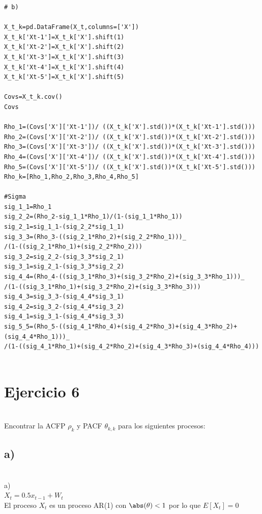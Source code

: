 \documentclass{article}
\begin{document}
\begin{verbatim}
# b)

X_t_k=pd.DataFrame(X_t,columns=['X'])
X_t_k['Xt-1']=X_t_k['X'].shift(1)
X_t_k['Xt-2']=X_t_k['X'].shift(2)
X_t_k['Xt-3']=X_t_k['X'].shift(3)
X_t_k['Xt-4']=X_t_k['X'].shift(4)
X_t_k['Xt-5']=X_t_k['X'].shift(5)

Covs=X_t_k.cov()
Covs

Rho_1=(Covs['X']['Xt-1'])/ ((X_t_k['X'].std())*(X_t_k['Xt-1'].std()))
Rho_2=(Covs['X']['Xt-2'])/ ((X_t_k['X'].std())*(X_t_k['Xt-2'].std()))
Rho_3=(Covs['X']['Xt-3'])/ ((X_t_k['X'].std())*(X_t_k['Xt-3'].std()))
Rho_4=(Covs['X']['Xt-4'])/ ((X_t_k['X'].std())*(X_t_k['Xt-4'].std()))
Rho_5=(Covs['X']['Xt-5'])/ ((X_t_k['X'].std())*(X_t_k['Xt-5'].std()))
Rho_k=[Rho_1,Rho_2,Rho_3,Rho_4,Rho_5]

#Sigma
sig_1_1=Rho_1
sig_2_2=(Rho_2-sig_1_1*Rho_1)/(1-(sig_1_1*Rho_1))
sig_2_1=sig_1_1-(sig_2_2*sig_1_1)
sig_3_3=(Rho_3-((sig_2_1*Rho_2)+(sig_2_2*Rho_1)))_
/(1-((sig_2_1*Rho_1)+(sig_2_2*Rho_2)))
sig_3_2=sig_2_2-(sig_3_3*sig_2_1)
sig_3_1=sig_2_1-(sig_3_3*sig_2_2)
sig_4_4=(Rho_4-((sig_3_1*Rho_3)+(sig_3_2*Rho_2)+(sig_3_3*Rho_1)))_
/(1-((sig_3_1*Rho_1)+(sig_3_2*Rho_2)+(sig_3_3*Rho_3)))
sig_4_3=sig_3_3-(sig_4_4*sig_3_1)
sig_4_2=sig_3_2-(sig_4_4*sig_3_2)
sig_4_1=sig_3_1-(sig_4_4*sig_3_3)
sig_5_5=(Rho_5-((sig_4_1*Rho_4)+(sig_4_2*Rho_3)+(sig_4_3*Rho_2)+(sig_4_4*Rho_1)))_
/(1-((sig_4_1*Rho_1)+(sig_4_2*Rho_2)+(sig_4_3*Rho_3)+(sig_4_4*Rho_4)))


\end{verbatim}



\section{Ejercicio 6}\\

Encontrar la ACFP $\rho_k$  y PACF $\theta_{k,k}$  para los siguientes procesos: \\

\subsection{a)}\\
a) \\

$X_t = 0.5 x_{t-1} + W_t$ \\

El proceso $X_t$ es un proceso AR(1) con $ \abs(\theta) <1 $  por lo que  $E[X_t]=0 $
\end{document}
